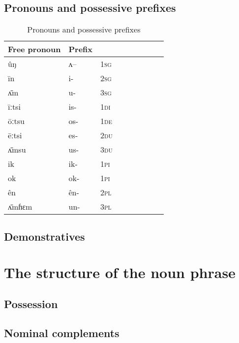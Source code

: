\documentclass[oldfontcommands,oneside,a4paper,11pt]{memoir}
\newcommand{\ipa}[1]{{\phon #1}} %
\newcommand{\du}{\textsc{du}}
\newcommand{\pl}{\textsc{pl}}
\newcommand{\sg}{\textsc{sg}}
\begin{document}
\section{Pronouns and possessive prefixes} \label{sec:pronouns}

 

\begin{table}[H] \centering
\caption{Pronouns and possessive prefixes }\label{tab:pronoun}
\begin{tabular}{lllllllll} \toprule
 Free pronoun & Prefix & \\
\midrule
 \ipa{ûŋ} &	\ipa{ʌ--}  &		1\sg{} \\
\ipa{īn}  &	\ipa{i-}  &			2\sg{} \\
\ipa{ʌ̄m}  &	\ipa{u-}  &			3\sg{} \\
\ipa{īːtsi}  &	\ipa{is-}  &			1\textsc{di} \\
\ipa{ōːtsu}  &	\ipa{os-}  &			1\textsc{de} \\
\ipa{ēːtsi}  &	\ipa{es-}  &		2\du{} \\	
\ipa{ʌ̄msu}  &	\ipa{us-}  &		3\du{} \\	
\ipa{ik}    &	\ipa{ik-}  &			1\textsc{pi} \\
\ipa{ok}    &	\ipa{ok-}  &			1\textsc{pi} \\
\ipa{ên}  &	\ipa{ên-}  &			2\pl{} \\
\ipa{ʌ̄mɦɛm}  &	\ipa{un-}  &			3\pl{} \\
\bottomrule
\end{tabular}
\end{table}
 	 
 
 
\section{Demonstratives} \label{sec:demonstratives}
\chapter{The structure of the noun phrase} \label{chapt:noun.phrase}

\section{Possession} \label{sec:possession}
 
 
\section{Nominal complements}  \label{sec:nom.comp}
 
\end{document}
